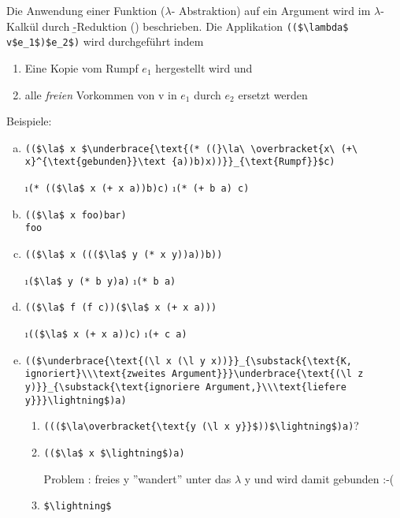 Die Anwendung einer Funktion ($\lambda$- Abstraktion) auf ein Argument wird im $\lambda$-Kalkül durch \b-Reduktion (\beval) beschrieben. Die Applikation \lstinline[mathescape]|(($\lambda$ v$e_1$)$e_2$)| wird durchgeführt indem
\begin{enumerate}[(1)]
\item Eine Kopie vom Rumpf $e_1$ hergestellt wird und
\item alle \emph{freien} Vorkommen von v in $e_1$ durch $e_2$ ersetzt werden
\end{enumerate}
Beispiele:\\
\begin{enumerate}[a)]
\item\lstinline[mathescape]|(($\la$ x $\underbrace{\text{(* ((}\la\ \overbracket{x\ (+\ x}^{\text{gebunden}}\text {a))b)x))}}_{\text{Rumpf}}$c)|
\begin{enumerate}[\beval]
\i \lstinline[mathescape]|(* (($\la$ x (+ x a))b)c)|
\i \lstinline[mathescape]|(* (+ b a) c)|
\end{enumerate}
\item\lstinline[mathescape]|(($\la$ x foo)bar)|\\
\beval \lstinline|foo|\\
\item\lstinline[mathescape]|(($\la$ x ((($\la$ y (* x y))a))b))|
\begin{enumerate}[\beval]
\i \lstinline[mathescape]|($\la$ y (* b y)a)|
\i \lstinline|(* b a)|
\end{enumerate}
\item \lstinline[mathescape]|(($\la$ f (f c))($\la$ x (+ x a)))|
\begin{enumerate}[\beval]
\i \lstinline[mathescape]|(($\la$ x (+ x a))c)|
\i \lstinline|(+ c a)|
\end{enumerate}
\item \lstinline[mathescape]|(($\underbrace{\text{(\l x (\l y x))}}_{\substack{\text{K, ignoriert}\\\text{zweites Argument}}}\underbrace{\text{(\l z y)}}_{\substack{\text{ignoriere Argument,}\\\text{liefere y}}}\lightning$)a)|
\begin{enumerate}[\beval]
\item \lstinline[mathescape]|((($\la\overbracket{\text{y (\l x y}}$))$\lightning$)a)|?
\item \lstinline[mathescape]|(($\la$ x $\lightning$)a)|\quad \parbox{.5\textwidth}{Problem : freies y ''wandert'' unter das $\lambda$ y und wird damit gebunden :-(}
\item \lstinline[mathescape]|$\lightning$|
\end{enumerate}
\end{enumerate}
